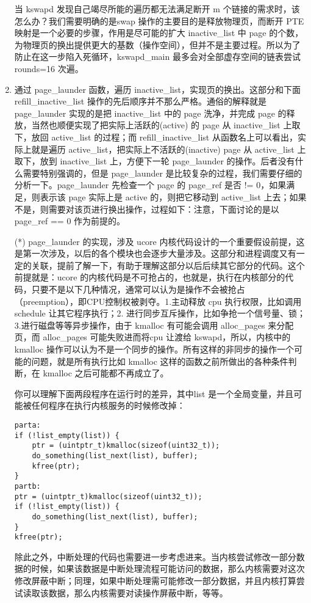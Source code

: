 \begin{enumerate}
  当 kswapd 发现自己竭尽所能的遍历都无法满足断开 m
  个链接的需求时，该怎么办？我们需要明确的是swap
  操作的主要目的是释放物理页，而断开 PTE
  映射是一个必要的步骤，作用是尽可能的扩大 inactive\_list 中 page
  的个数，为物理页的换出提供更大的基数（操作空间），但并不是主要过程。所以为了防止在这一步陷入死循环，kswapd\_main
  最多会对全部虚存空间的链表尝试 rounds=16 次遍。
\item
  通过 page\_launder 函数，遍历
  inactive\_list，实现页的换出。这部分和下面 refill\_inactive\_list
  操作的先后顺序并不那么严格。通俗的解释就是 page\_launder 实现的是把
  inactive\_list 中的 page 洗净，并完成 page
  的释放，当然也顺便实现了把实际上活跃的(active) 的 page 从
  inactive\_list 上取下，放回 active\_list 的过程；而
  refill\_inactive\_list 从函数名上可以看出，实际上就是遍历
  active\_list，把实际上不活跃的(inactive) page 从 active\_list
  上取下，放到 inactive\_list 上，方便下一轮 page\_launder
  的操作。后者没有什么需要特别强调的，但是 page\_launder
  是比较复杂的过程，我们需要仔细的分析一下。page\_launder 先检查一个
  page 的 page\_ref 是否 != 0，如果满足，则表示该 page 实际上是 active
  的，则把它移动到 active\_list
  上去；如果不是，则需要对该页进行换出操作，过程如下：注意，下面讨论的是以
  page\_ref == 0 作为前提的。

  (*) page\_launder 的实现，涉及 ucore
  内核代码设计的一个重要假设前提，这是第一次涉及，以后的各个模块也会逐步大量涉及。这部分和进程调度又有一定的关联，提前了解一下，有助于理解这部分以后后续其它部分的代码。这个前提就是：ucore
  的内核代码是不可抢占的，也就是，执行在内核部分的代码，只要不是以下几种情况，通常可以认为是操作不会被抢占（preemption），即CPU控制权被剥夺。1.主动释放
  cpu 执行权限，比如调用 schedule 让其它程序执行；2.
  进行同步互斥操作，比如争抢一个信号量、锁；3.进行磁盘等等异步操作，由于
  kmalloc 有可能会调用 alloc\_pages 来分配页，而 alloc\_pages
  可能失败进而将cpu 让渡给 kswapd，所以，内核中的 kmalloc
  操作可以认为不是一个同步的操作。所有这样的非同步的操作一个可能的问题，就是所有执行比如
  kmalloc 这样的函数之前所做出的各种条件判断，在 kmalloc
  之后可能都不再成立了。

  你可以理解下面两段程序在运行时的差异，其中list
  是一个全局变量，并且可能被任何程序在执行内核服务的时候修改掉：

\begin{lstlisting}
parta:
if (!list_empty(list)) {
    ptr = (uintptr_t)kmalloc(sizeof(uint32_t));
    do_something(list_next(list), buffer);
    kfree(ptr);
}
partb:
ptr = (uintptr_t)kmalloc(sizeof(uint32_t));
if (!list_empty(list)) {
    do_something(list_next(list), buffer);
}
kfree(ptr);
\end{lstlisting}

  除此之外，中断处理的代码也需要进一步考虑进来。当内核尝试修改一部分数据的时候，如果该数据是中断处理流程可能访问的数据，那么内核需要对这次修改屏蔽中断；同理，如果中断处理需可能修改一部分数据，并且内核打算尝试读取该数据，那么内核需要对读操作屏蔽中断，等等。
\end{enumerate}

